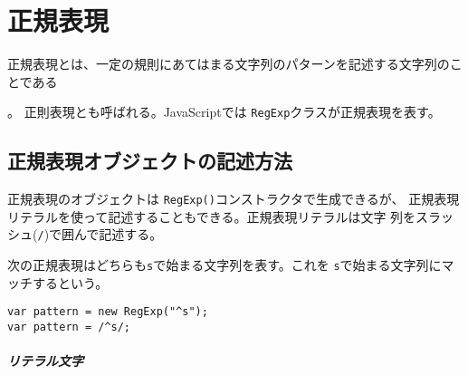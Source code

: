 \chapter{正規表現}
正規表現とは、一定の規則にあてはまる文字列のパターンを記述する文字列のこ
とである
\iffalse%
同等のものであったが、最近の計算機言語で取り扱う正則言語は機能が拡張され、
正則言語より広い範囲の形式言語を記述することが可能となっている。}
\fi
。
正則表現とも呼ばれる。JavaScriptでは
\texttt{RegExp}クラスが正規表現を表す。
\section{正規表現オブジェクトの記述方法}
正規表現のオブジェクトは \texttt{RegExp()}コンストラクタで生成できるが、
正規表現リテラルを使って記述することもできる。正規表現リテラルは文字
列をスラッシュ(\texttt{/})で囲んで記述する。

次の正規表現はどちらも\texttt{s}で始まる文字列を表す。これを
\texttt{s}で始まる文字列にマッチするという。
\begin{verbatim}
var pattern = new RegExp("^s");
var pattern = /^s/;
\end{verbatim}
\iffalse%
正規表現内の文字には通常の文
字(ここでは\texttt{s})を表すものと、特別な意味を持つ文字(ここでは
\verb+^+)がある。特別な意味を持つ文字はメタ文字と呼ばれる。
\fi
\paragraph{リテラル文字}

